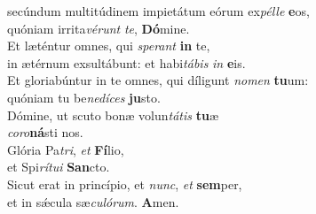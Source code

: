 \evenverse  secúndum multitúdinem impietátum eórum ex\textit{pél}\textit{le} \textbf{e}os,~\*\\
\evenverse quóniam irrita\textit{vé}\textit{runt} \textit{te}, \textbf{Dó}mine.\\
\oddverse Et læténtur omnes, qui \textit{spe}\textit{rant} \textbf{in} te,~\*\\
\oddverse in ætérnum exsultábunt: et habi\textit{tá}\textit{bis} \textit{in} \textbf{e}is.\\
\evenverse Et gloriabúntur in te omnes, qui díligunt \textit{no}\textit{men} \textbf{tu}um:~\*\\
\evenverse quóniam tu be\textit{ne}\textit{dí}\textit{ces} \textbf{ju}sto.\\
\oddverse Dómine, ut scuto bonæ volun\textit{tá}\textit{tis} \textbf{tu}æ~\*\\
\oddverse \textit{co}\textit{ro}\textbf{ná}sti nos.\\
\evenverse Glória Pa\textit{tri}, \textit{et} \textbf{Fí}lio,~\*\\
\evenverse et Spi\textit{rí}\textit{tu}\textit{i} \textbf{San}cto.\\
\oddverse Sicut erat in princípio, et \textit{nunc}, \textit{et} \textbf{sem}per,~\*\\
\oddverse et in sǽcula sæ\textit{cu}\textit{ló}\textit{rum}. \textbf{A}men.\\

